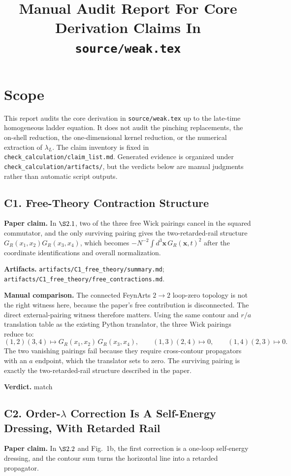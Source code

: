 \documentclass[11pt]{article}
\title{Manual Audit Report For Core Derivation Claims In \texttt{source/weak.tex}}
\date{}
\begin{document}
\maketitle

\section*{Scope}
This report audits the core derivation in \texttt{source/weak.tex} up to the late-time homogeneous ladder equation. It does not audit the pinching replacements, the on-shell reduction, the one-dimensional kernel reduction, or the numerical extraction of $\lambda_L$. The claim inventory is fixed in \texttt{check\_calculation/claim\_list.md}. Generated evidence is organized under \texttt{check\_calculation/artifacts/}, but the verdicts below are manual judgments rather than automatic script outputs.

\subsection*{C1. Free-Theory Contraction Structure}
\textbf{Paper claim.} In $\S 2.1$, two of the three free Wick pairings cancel in the squared commutator, and the only surviving pairing gives the two-retarded-rail structure $G_R(x_1,x_2)G_R(x_3,x_4)$, which becomes $-N^{-2}\int d^3\mathbf{x}\,G_R(\mathbf{x},t)^2$ after the coordinate identifications and overall normalization.

\textbf{Artifacts.} \texttt{artifacts/C1\_free\_theory/summary.md}; \texttt{artifacts/C1\_free\_theory/free\_contractions.md}.

\textbf{Manual comparison.} The connected FeynArts $2\to2$ loop-zero topology is not the right witness here, because the paper's free contribution is disconnected. The direct external-pairing witness therefore matters. Using the same contour and $r/a$ translation table as the existing Python translator, the three Wick pairings reduce to:
\[
(1,2)(3,4)\mapsto G_R(x_1,x_2)\,G_R(x_3,x_4),\qquad
(1,3)(2,4)\mapsto 0,\qquad
(1,4)(2,3)\mapsto 0.
\]
The two vanishing pairings fail because they require cross-contour propagators with an $a$ endpoint, which the translator sets to zero. The surviving pairing is exactly the two-retarded-rail structure described in the paper.

\textbf{Verdict.} match

\subsection*{C2. Order-$\lambda$ Correction Is A Self-Energy Dressing, With Retarded Rail}
\textbf{Paper claim.} In $\S 2.2$ and Fig.~1b, the first correction is a one-loop self-energy dressing, and the contour sum turns the horizontal line into a retarded propagator.
\end{document}

